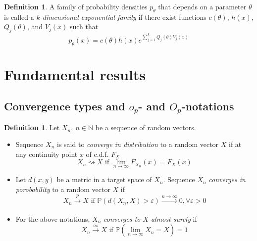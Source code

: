 \documentclass[12pt]{article}
\theoremstyle{definition}
\newtheorem{definition}[theorem]{Definition}
\theoremstyle{remark}
\numberwithin{equation}{section}
\newcommand{\PP}{\mathbb{P}}
\newcommand{\NN}{\mathbb{N}}
\begin{document}
\begin{definition}\label{exponential_family}
	A family of probability densities $p_\theta$ that depends on a parameter $\theta$ is called a $k$\emph{-dimensional exponential family} if there exist functions $c(\theta)$, $h(x)$, $Q_j(\theta)$, and $V_j(x)$ such that
	\begin{equation*}
		p_\theta(x) = c(\theta)h(x)e^{\sum_{j=1}^k Q_j(\theta)V_j(x)}
	\end{equation*}
\end{definition}

\section{Fundamental results}

\subsection{Convergence types and $o_p$- and $O_p$-notations}
\begin{definition}\label{convdef}
Let $X_n,\ n\in\NN$ be a sequence of random vectors.
	\begin{itemize}
		\item Sequence $X_n$ is said to \emph{converge in distribution} to a random vector $X$ if at any continuity point $x$ of c.d.f. $F_X$
		\begin{equation*}
			X_n \rightsquigarrow X \text{ if } \lim_{n\rightarrow \infty} F_{X_n}(x) = F_X(x)
		\end{equation*}
		\item Let $d(x,y)$ be a metric in a target space of $X_n$. Sequence $X_n$ \emph{converges in porobability} to a random vector $X$ if
		\begin{equation*}
 X_n \xrightarrow[]{p} X\text{ if } \PP(d(X_n, X) > \varepsilon)\xrightarrow[]{n\rightarrow\infty} 0, \forall \varepsilon >0
		\end{equation*}
		\item For the above notations, $X_n$ \emph{converges to $X$ almost surely} if
		\begin{equation*}
			 X_n\xrightarrow[]{as} X \text{ if } \PP\left(\lim_{n\rightarrow\infty}X_n = X\right) = 1
		\end{equation*}
	\end{itemize}
\end{definition}
\end{document}

